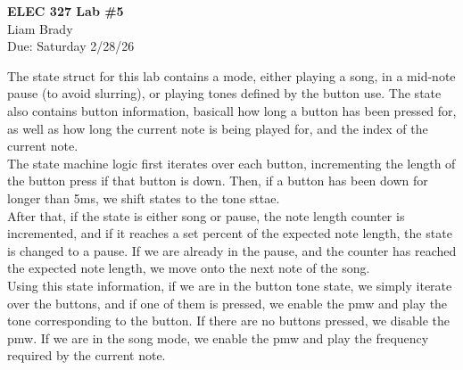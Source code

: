 \documentclass[12pt]{article}
\begin{document}
\begin{center}
\textbf{ELEC 327 Lab \#5} \\[6pt]
Liam Brady \\
Due: Saturday 2/28/26
\end{center}

The state struct for this lab contains a mode, either playing a song, in a mid-note pause (to avoid slurring), or playing tones defined by the button use. The state also contains button information, basicall how long a button has been pressed for, as well as how long the current note is being played for, and the index of the current note. \\
\indent The state machine logic first iterates over each button, incrementing the length of the button press if that button is down. Then, if a button has been down for longer than 5ms, we shift states to the tone sttae. \\
\indent After that, if the state is either song or pause, the note length counter is incremented, and if it reaches a set percent of the expected note length, the state is changed to a pause. If we are already in the pause, and the counter has reached the expected note length, we move onto the next note of the song. \\
\indent Using this state information, if we are in the button tone state, we simply iterate over the buttons, and if one of them is pressed, we enable the pmw and play the tone corresponding to the button. If there are no buttons pressed, we disable the pmw. If we are in the song mode, we enable the pmw and play the frequency required by the current note.
\end{document}
